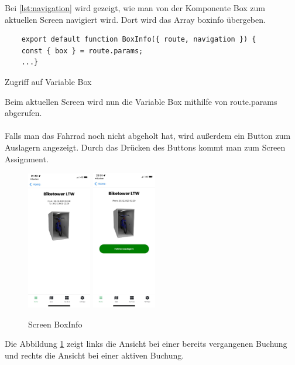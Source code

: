 Bei \ref*{lst:navigation} wird gezeigt, wie man von der Komponente Box zum aktuellen Screen navigiert wird. Dort wird das \Gls{Array} boxinfo übergeben.\\
\begin{listing}[H]
  \begin{verbatim}
    export default function BoxInfo({ route, navigation }) {
    const { box } = route.params;
    ...}
\end{verbatim}
  \caption{Zugriff auf Variable Box}
  \label{lst:zugriff}
\end{listing}
Beim aktuellen Screen wird nun die Variable Box mithilfe von route.params abgerufen. \\ \\
Falls man das Fahrrad noch nicht abgeholt hat, wird außerdem ein Button zum Auslagern angezeigt. Durch das Drücken des Buttons kommt man zum Screen Assignment.\\
\begin{figure}[H]
  \centering
  \includegraphics[width=0.25\textwidth]{images/app-screenshots/screenboxinfo.png}
  \includegraphics[width=0.25\textwidth]{images/app-screenshots/screenboxinfov.png}
  \caption{Screen BoxInfo}
  \label{fig:screenboxinfo}
\end{figure}
Die Abbildung \ref{fig:screenboxinfo} zeigt links die Ansicht bei einer bereits vergangenen Buchung und rechts die Ansicht bei einer aktiven Buchung.\\



